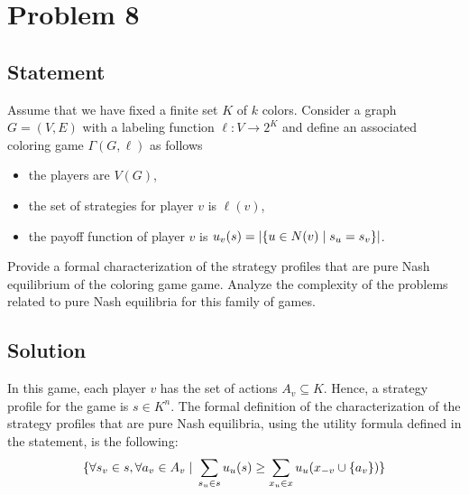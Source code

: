 \documentclass[a4paper, 11pt]{article}
\newcommand{\onemm}[0]{\hspace{1mm}}
\newcommand{\suchthat}[0]{\onemm|\onemm}
\begin{document}
\section*{Problem 8}
{\color{statement}
\subsection*{Statement}
Assume that we have fixed a finite set $K$ of $k$ colors. Consider a graph $G = (V, E)$ with a labeling function $\ell: V \rightarrow 2^K$ and define an associated coloring game $\Gamma(G, \ell)$ as follows
\begin{itemize}
    \item the players are $V(G)$,
    \item the set of strategies for player $v$ is $\ell(v)$,
    \item the payoff function of player $v$ is $u_v(s) = |\{u \in N(v) \suchthat s_u = s_v \}|$.
\end{itemize}

Provide a formal characterization of the strategy profiles that are pure Nash equilibrium of the coloring game game. Analyze the complexity of the problems related to pure Nash equilibria for this family of games.}

\subsection*{Solution}
In this game, each player $v$ has the set of actions $A_v \subseteq K$. Hence, a strategy profile for the game is $s \in K^n$. The formal definition of the characterization of the strategy profiles that are pure Nash equilibria, using the utility formula defined in the statement, is the following:
\[
    \{\forall s_v \in s, \forall a_v \in A_v \suchthat \sum_{s_u\in s}u_u(s)\geq \sum_{x_u\in x}u_u(x_{-v}\cup \{a_v\}) \}
\]



\end{document}
